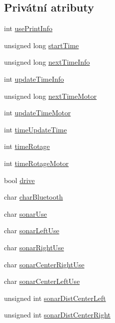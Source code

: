 \subsection*{Privátní atributy}
\begin{DoxyCompactItemize}
\item 
int \hyperlink{class_sekacka_a41aa8e032754f0b39f3d86583972e9ca}{use\+Print\+Info}
\item 
unsigned long \hyperlink{class_sekacka_a34c88c43f0c6573f8005d7d40ccbec75}{start\+Time}
\item 
unsigned long \hyperlink{class_sekacka_ad1a2be8445580ee6da05f49c0d7905e9}{next\+Time\+Info}
\item 
int \hyperlink{class_sekacka_a796c17e80ad5c084b336197e609c2f0e}{update\+Time\+Info}
\item 
unsigned long \hyperlink{class_sekacka_a3d40897d033fe36d1644520562a3c497}{next\+Time\+Motor}
\item 
int \hyperlink{class_sekacka_a8d00207d9eeb49ca50dcf1cfae2bf89a}{update\+Time\+Motor}
\item 
int \hyperlink{class_sekacka_a0407757c0371f299eac49abf5feb1f77}{time\+Update\+Time}
\item 
int \hyperlink{class_sekacka_a82a00364ae6395253285518471f3132b}{time\+Rotage}
\item 
int \hyperlink{class_sekacka_a87ae7490a2de5bfd9f8a6e5e2f09b207}{time\+Rotage\+Motor}
\item 
bool \hyperlink{class_sekacka_aa135507dbc52a6c2dd6e9f6ff2457b36}{drive}
\item 
char \hyperlink{class_sekacka_a518f65b47b3cd448734ee0a0022cfea1}{char\+Bluetooth}
\item 
char \hyperlink{class_sekacka_a64d54c86f397f9c2bf469dabb8d82176}{sonar\+Use}
\item 
char \hyperlink{class_sekacka_a78af23ffa04ade64990fa72c8ae10543}{sonar\+Left\+Use}
\item 
char \hyperlink{class_sekacka_a742636442a58009b65d5ddfce21333b8}{sonar\+Right\+Use}
\item 
char \hyperlink{class_sekacka_aa1dda76e93ca7282a9ae50dc4f980301}{sonar\+Center\+Right\+Use}
\item 
char \hyperlink{class_sekacka_aa43c6437efd1edbcfdbb22496ed4a226}{sonar\+Center\+Left\+Use}
\item 
unsigned int \hyperlink{class_sekacka_ac854e19a9eb8d30384f5ab0cdcdbaebf}{sonar\+Dist\+Center\+Left}
\item 
unsigned int \hyperlink{class_sekacka_ac9d9f43f254129e928f8855847132de0}{sonar\+Dist\+Center\+Right}

\end{DoxyCompactItemize}
